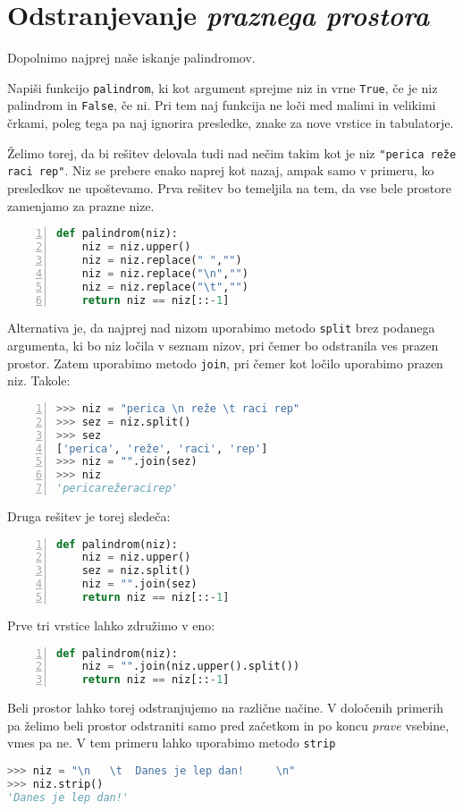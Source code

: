 \section{Odstranjevanje \emph{praznega prostora}}

Dopolnimo najprej naše iskanje palindromov.
\begin{zgled}
Napiši funkcijo \texttt{palindrom}, ki kot argument sprejme niz in vrne \texttt{True}, če je niz palindrom in \texttt{False}, če ni. Pri tem naj funkcija ne loči med malimi in velikimi črkami, poleg tega pa naj ignorira presledke, znake za nove vrstice in tabulatorje.
\end{zgled}

\begin{resitev}
Želimo torej, da bi rešitev delovala tudi nad nečim takim kot je niz \texttt{"perica reže raci rep"}. Niz se prebere enako naprej kot nazaj, ampak samo v primeru, ko presledkov ne upoštevamo. Prva rešitev bo temeljila na tem, da vse bele prostore zamenjamo za prazne nize.
\begin{lstlisting}[language=Python,numbers=left]
def palindrom(niz):
    niz = niz.upper()
    niz = niz.replace(" ","")
    niz = niz.replace("\n","")
    niz = niz.replace("\t","")
    return niz == niz[::-1]
\end{lstlisting}
Alternativa je, da najprej nad nizom uporabimo metodo \texttt{split} brez podanega argumenta, ki bo niz ločila v seznam nizov, pri čemer bo odstranila ves prazen prostor. Zatem uporabimo metodo \texttt{join}, pri čemer kot ločilo uporabimo prazen niz. Takole:
\begin{lstlisting}[language=Python,numbers=left]
>>> niz = "perica \n reže \t raci rep"
>>> sez = niz.split()
>>> sez
['perica', 'reže', 'raci', 'rep']
>>> niz = "".join(sez)
>>> niz
'pericarežeracirep'
\end{lstlisting}
Druga rešitev je torej sledeča:
\begin{lstlisting}[language=Python,numbers=left]
def palindrom(niz):
    niz = niz.upper()
    sez = niz.split()
    niz = "".join(sez)
    return niz == niz[::-1]
\end{lstlisting}
Prve tri vrstice lahko združimo v eno:
\begin{lstlisting}[language=Python,numbers=left]
def palindrom(niz):
    niz = "".join(niz.upper().split())
    return niz == niz[::-1]
\end{lstlisting}
\end{resitev}

Beli prostor lahko torej odstranjujemo na različne načine. V določenih primerih pa želimo beli prostor odstraniti samo pred začetkom in po koncu \emph{prave} vsebine, vmes pa ne. V tem primeru lahko uporabimo metodo \texttt{strip}
\begin{lstlisting}[language=Python]
>>> niz = "\n   \t  Danes je lep dan!     \n"
>>> niz.strip()
'Danes je lep dan!'
\end{lstlisting}

